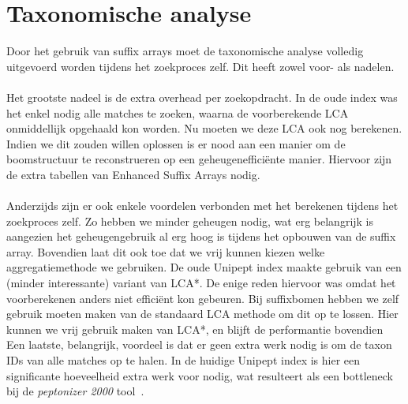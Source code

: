 \section{Taxonomische analyse}\label{sec:taxonomische-analyse}
Door het gebruik van suffix arrays moet de taxonomische analyse volledig uitgevoerd worden tijdens het zoekproces zelf.
Dit heeft zowel voor- als nadelen.
\\ \\
Het grootste nadeel is de extra overhead per zoekopdracht.
In de oude index was het enkel nodig alle matches te zoeken, waarna de voorberekende LCA onmiddellijk opgehaald kon worden.
Nu moeten we deze LCA ook nog berekenen.
Indien we dit zouden willen oplossen is er nood aan een manier om de boomstructuur te reconstrueren op een geheugenefficiënte manier.
Hiervoor zijn de extra tabellen van Enhanced Suffix Arrays nodig.
\\ \\
Anderzijds zijn er ook enkele voordelen verbonden met het berekenen tijdens het zoekproces zelf.
Zo hebben we minder geheugen nodig, wat erg belangrijk is aangezien het geheugengebruik al erg hoog is tijdens het opbouwen van de suffix array.
Bovendien laat dit ook toe dat we vrij kunnen kiezen welke aggregatiemethode we gebruiken.
De oude Unipept index maakte gebruik van een (minder interessante) variant van LCA*.
De enige reden hiervoor was omdat het voorberekenen anders niet efficiënt kon gebeuren.
Bij suffixbomen hebben we zelf gebruik moeten maken van de standaard LCA methode om dit op te lossen.
Hier kunnen we vrij gebruik maken van LCA*, en blijft de performantie bovendien
Een laatste, belangrijk, voordeel is dat er geen extra werk nodig is om de taxon IDs van alle matches op te halen.
In de huidige Unipept index is hier een significante hoeveelheid extra werk voor nodig, wat resulteert als een bottleneck bij de \textit{peptonizer 2000} tool~\cite{pep_gm}.


